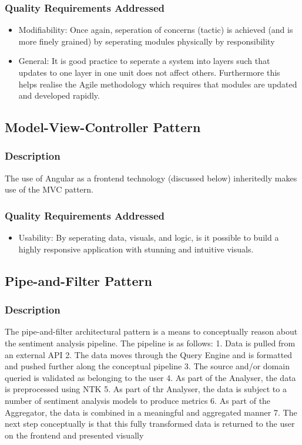\documentclass[12pt]{article}
\begin{document}
\subsubsection{Quality Requirements Addressed}
\begin{itemize}
    \item Modifiability: Once again, seperation of concerns (tactic) is achieved (and is more finely grained) by seperating modules physically by responsibility
    \item General: It is good practice to seperate a system into layers such that updates to one layer in one unit does not affect others. Furthermore this helps realise the Agile methodology which requires that modules are updated and developed rapidly.
\end{itemize}
\subsection{Model-View-Controller Pattern}
\subsubsection{Description}
The use of Angular as a frontend technology (discussed below) inheritedly makes use of the MVC pattern.
\subsubsection{Quality Requirements Addressed}
\begin{itemize}
    \item Usability: By seperating data, visuals, and logic, is it possible to build a highly responsive application with stunning and intuitive visuals.
\end{itemize}
\subsection{Pipe-and-Filter Pattern}
\subsubsection{Description}
The pipe-and-filter architectural pattern is a means to conceptually reason about the sentiment analysis pipeline. The pipeline is as follows: 1. Data is pulled from an external API 2. The data moves through the Query Engine and is formatted and pushed further along the conceptual pipeline 3. The source and/or domain queried is validated as belonging to the user 4. As part of the Analyser, the data is preprocessed using NTK 5. As part of thr Analyser, the data is subject to a number of sentiment analysis models to produce metrics 6. As part of the Aggregator, the data is combined in a meaningful and aggregated manner 7. The next step conceptually is that this fully transformed data is returned to the user on the frontend and presented visually
\end{document}
